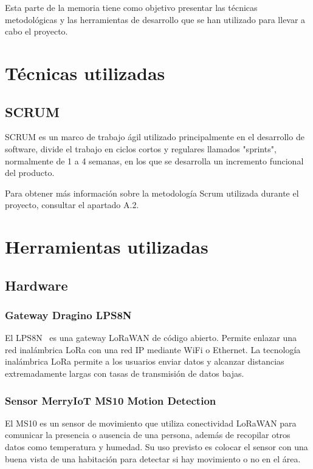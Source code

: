 Esta parte de la memoria tiene como objetivo presentar las técnicas metodológicas y las herramientas de desarrollo que se han utilizado para llevar a cabo el proyecto.

\section{Técnicas utilizadas}
\subsection{SCRUM}
SCRUM es un marco de trabajo ágil utilizado principalmente en el desarrollo de software, divide el trabajo en ciclos cortos y regulares llamados "sprints", normalmente de 1 a 4 semanas, en los que se desarrolla un incremento funcional del producto.

Para obtener más información sobre la metodología Scrum utilizada durante el proyecto, consultar el apartado A.2.

\section{Herramientas utilizadas}
\subsection{Hardware}
\subsubsection{Gateway Dragino LPS8N}
El LPS8N~\cite{Haw:Dra} es una gateway LoRaWAN de código abierto. Permite enlazar una red inalámbrica LoRa con una red IP mediante WiFi o Ethernet. La tecnología inalámbrica LoRa permite a los usuarios enviar datos y alcanzar distancias extremadamente largas con tasas de transmisión de datos bajas.


\subsubsection{Sensor MerryIoT MS10 Motion Detection}
El MS10 es un sensor de movimiento que utiliza conectividad LoRaWAN para comunicar la presencia o ausencia de una persona, además de recopilar otros datos como temperatura y humedad.  Su uso previsto es colocar el sensor con una buena vista de una habitación para detectar si hay movimiento o no en el área.

